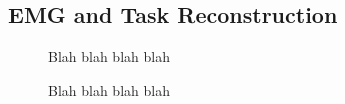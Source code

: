 \documentclass[../main.tex]{subfiles}
\begin{document}
\subsection{EMG and Task Reconstruction}

\begin{figure}[H]
    \caption{Blah blah blah blah}\label{fig:behavior}
\end{figure}

\begin{figure}[H]
    \caption{Blah blah blah blah}\label{fig:behavior}
\end{figure}
\end{document}
